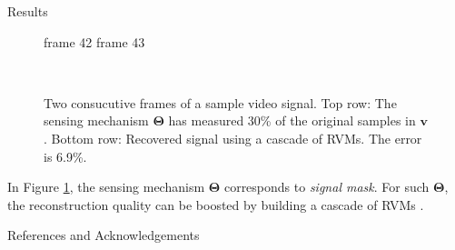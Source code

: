\documentclass[final]{beamer}
\begin{document}
\begin{frame}{}
\begin{textblock}{19.5}
\begin{block}{Results}
\begin{figure}
\begin{minipage}{0.8\linewidth}
\scriptsize\hphantom{.}\hspace{2.5cm} frame 42 \hspace{3cm} frame 43
\end{minipage}\\
\begin{minipage}{0.95\linewidth}
\caption{Two consucutive frames of a sample video signal.
  Top row: The sensing mechanism $\bm\Theta$ has measured 30\% of the original samples in $\bm v$. 
  Bottom row: Recovered signal using a cascade of RVMs. The error is 6.9\%.}
\label{fig}
\end{minipage}
\end{figure}
In Figure \ref{fig}, the sensing mechanism $\bm\Theta$ corresponds to \emph{signal mask}.
For such $\bm\Theta$, the reconstruction quality can be boosted by building a cascade of RVMs \cite{pilikos2014}.


\end{block}
\begin{block}{References and Acknowledgements}
\begin{minipage}{.9\linewidth}
     {     \printbibliography   %
     } 
\end{minipage}
\vspace{2ex}
\end{block}

\end{textblock}

\end{frame}
\end{document}

